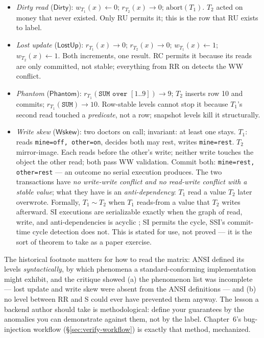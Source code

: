 \begin{itemize}
\item \emph{Dirty read} ($\mathsf{Dirty}$): $w_{T_1}(x){\leftarrow}0$; $r_{T_2}(x){\to}0$;
$\mathrm{abort}(T_1)$. $T_2$ acted on money that never existed. Only RU
permits it; this is the row that RU exists to label.

\item \emph{Lost update} ($\mathsf{LostUp}$): $r_{T_1}(x){\to}0$; $r_{T_2}(x){\to}0$;
$w_{T_1}(x){\leftarrow}1$; $w_{T_2}(x){\leftarrow}1$. Both increments, one
result. RC permits it because its reads are only committed, not stable;
everything from RR on detects the WW conflict.

\item \emph{Phantom} ($\mathsf{Phantom}$): $r_{T_1}(\texttt{SUM over }[1..9]){\to}9$; $T_2$
inserts row 10 and commits; $r_{T_1}(\texttt{SUM}){\to}10$. Row-stable
levels cannot stop it because $T_1$'s second read touched a \emph{predicate},
not a row; snapshot levels kill it structurally.

\item \emph{Write skew} ($\mathsf{Wskew}$): two doctors on call; invariant: at least one stays.
$T_1$: reads \texttt{mine=off, other=on}, decides both may rest, writes
\texttt{mine=rest}. $T_2$ mirror-image. Each reads before the other's write;
neither write touches the object the other read; both pass WW validation.
Commit both: \texttt{mine=rest, other=rest} --- an outcome no serial
execution produces. The two transactions have \emph{no write-write conflict
and no read-write conflict with a stable value}; what they have is an
\emph{anti-dependency}: $T_1$ read a value $T_2$ later overwrote. Formally,
$T_1 \mathop{\sim} T_2$ when $T_1$ reads-from a value that $T_2$ writes
afterward. SI executions are serializable exactly when the graph of read,
write, and anti-dependencies is acyclic \cite{berenson95critique}; SI permits
the cycle, SSI's commit-time cycle detection does not. This is stated for
use, not proved --- it is the sort of theorem to take as a paper exercise.
\end{itemize}

The historical footnote matters for how to read the matrix: ANSI defined its
levels \emph{syntactically}, by which phenomena a standard-conforming
implementation might exhibit, and the critique \cite{berenson95critique}
showed (a) the phenomenon list was incomplete --- lost update and write skew
were absent from the ANSI definitions --- and (b) no level between RR and S
could ever have prevented them anyway. The lesson a backend author should
take is methodological: define your guarantees by the anomalies you can
demonstrate against them, not by the label. Chapter~6's bug-injection
workflow (\S\ref{sec:verify-workflow}) is exactly that method, mechanized.

